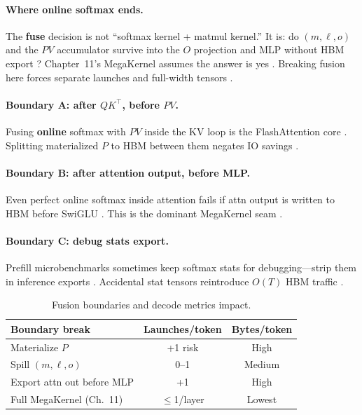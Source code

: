 \paragraph{Where online softmax ends.} The \textbf{fuse} decision is not ``softmax kernel + matmul kernel.'' It is: do $(m,\ell,o)$ and the $PV$ accumulator survive into the $O$ projection and MLP without HBM export \citep{taxbreak2026,memoryfloor2026,dao2022flashattention}? Chapter~11's MegaKernel assumes the answer is yes \citep{taxbreak2026,yirage2026}. Breaking fusion here forces separate launches and full-width tensors \citep{nvidia2024cudagraphs,kwon2023vllm}.

\paragraph{Boundary A: after $QK^\top$, before $PV$.} Fusing \textbf{online} softmax with $PV$ inside the KV loop is the FlashAttention core \citep{dao2022flashattention}. Splitting materialized $P$ to HBM between them negates IO savings \citep{memoryfloor2026}.

\paragraph{Boundary B: after attention output, before MLP.} Even perfect online softmax inside attention fails if attn output is written to HBM before SwiGLU \citep{taxbreak2026,patel2025llminference}. This is the dominant MegaKernel seam \citep{yirage2026,chen2020compilerbasedhardw,liu2024deepseekv3}.

\paragraph{Boundary C: debug stats export.} Prefill microbenchmarks sometimes keep softmax stats for debugging---strip them in inference exports \citep{dlbook,nvidia2024cudagraphs}. Accidental stat tensors reintroduce $O(T)$ HBM traffic \citep{memoryfloor2026}.

\begin{table}[t]
\centering
\caption{Fusion boundaries and decode metrics impact.}
\label{tab:fusion_boundary}
\begin{tabular}{lcc}
\toprule
\textbf{Boundary break} & \textbf{Launches/token} & \textbf{Bytes/token} \\
\midrule
Materialize $P$ & +1 risk & High \\
Spill $(m,\ell,o)$ & 0--1 & Medium \\
Export attn out before MLP & +1 & High \\
Full MegaKernel (Ch.~11) & $\leq$1/layer & Lowest \\
\bottomrule
\end{tabular}
\end{table}

